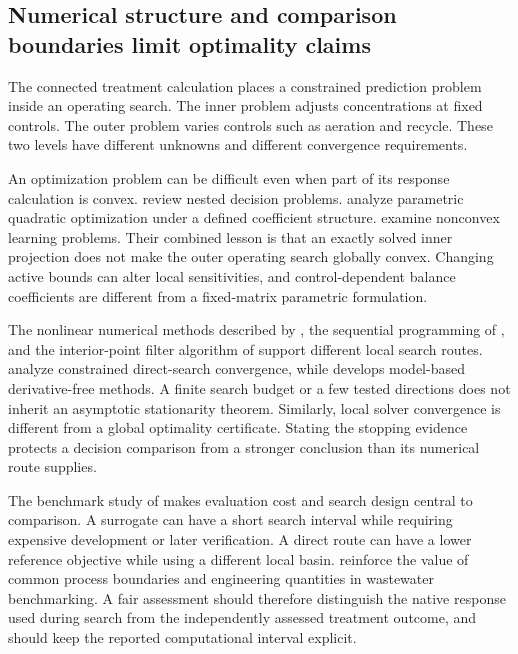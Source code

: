 \subsection{Numerical structure and comparison boundaries limit optimality claims}

The connected treatment calculation places a constrained prediction problem inside an operating search. The inner problem adjusts concentrations at fixed controls. The outer problem varies controls such as aeration and recycle. These two levels have different unknowns and different convergence requirements.

An optimization problem can be difficult even when part of its response calculation is convex. \citet{Colson2007} review nested decision problems. \citet{Tondel2003} analyze parametric quadratic optimization under a defined coefficient structure. \citet{JainKar2017} examine nonconvex learning problems. Their combined lesson is that an exactly solved inner projection does not make the outer operating search globally convex. Changing active bounds can alter local sensitivities, and control-dependent balance coefficients are different from a fixed-matrix parametric formulation.

The nonlinear numerical methods described by \citet{BuzziFerraris2013}, the sequential programming of \citet{Kraft1988}, and the interior-point filter algorithm of \citet{WachterBiegler2006} support different local search routes. \citet{AudetDennis2006} analyze constrained direct-search convergence, while \citet{Ragonneau2022} develops model-based derivative-free methods. A finite search budget or a few tested directions does not inherit an asymptotic stationarity theorem. Similarly, local solver convergence is different from a global optimality certificate. Stating the stopping evidence protects a decision comparison from a stronger conclusion than its numerical route supplies.

The benchmark study of \citet{Bliek2023} makes evaluation cost and search design central to comparison. A surrogate can have a short search interval while requiring expensive development or later verification. A direct route can have a lower reference objective while using a different local basin. \citet{Zhang2026} reinforce the value of common process boundaries and engineering quantities in wastewater benchmarking. A fair assessment should therefore distinguish the native response used during search from the independently assessed treatment outcome, and should keep the reported computational interval explicit.

